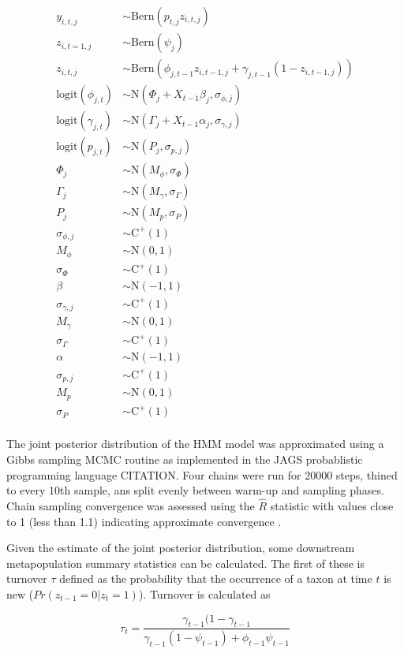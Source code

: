 \documentclass[12pt,letterpaper]{article}
\begin{document}
\begin{equation}
  \begin{aligned}
    y_{i, t, j} &\sim \mathrm{Bern}(p_{t, j} z_{i, t, j}) \\
    z_{i, t = 1, j} &\sim \mathrm{Bern}(\psi_{j}) \\
    z_{i, t, j} &\sim \mathrm{Bern}(\phi_{j, t - 1} z_{i, t - 1, j} + \gamma_{j, t - 1} (1 - z_{i, t - 1, j})) \\
    \mathrm{logit}(\phi_{j, t}) &\sim \mathrm{N}(\Phi_{j} + X_{t - 1}\beta_{j}, \sigma_{\phi, j}) \\
    \mathrm{logit}(\gamma_{j, t}) &\sim \mathrm{N}(\Gamma_{j} + X_{t - 1}\alpha_{j}, \sigma_{\gamma, j}) \\
    \mathrm{logit}(p_{j, t}) &\sim \mathrm{N}(P_{j}, \sigma_{p, j}) \\
    \Phi_{j} &\sim \mathrm{N}(M_{\phi}, \sigma_{\Phi}) \\
    \Gamma_{j} &\sim \mathrm{N}(M_{\gamma}, \sigma_{\Gamma}) \\
    P_{j} &\sim \mathrm{N}(M_{p}, \sigma_{P}) \\
    \sigma_{\phi, j} &\sim \mathrm{C}^{+}(1) \\
    M_{\phi} &\sim \mathrm{N}(0, 1) \\
    \sigma_{\Phi} &\sim \mathrm{C}^{+}(1) \\
    \beta &\sim \mathrm{N}(-1, 1) \\
    \sigma_{\gamma, j} &\sim \mathrm{C}^{+}(1) \\
    M_{\gamma} &\sim \mathrm{N}(0, 1) \\
    \sigma_{\Gamma} &\sim \mathrm{C}^{+}(1) \\
    \alpha &\sim \mathrm{N}(-1, 1) \\
    \sigma_{p, j} &\sim \mathrm{C}^{+}(1) \\
    M_{p} &\sim \mathrm{N}(0, 1) \\
    \sigma_{P} &\sim \mathrm{C}^{+}(1) \\
  \end{aligned}
\end{equation}


The joint posterior distribution of the HMM model was approximated using a Gibbs sampling MCMC routine as implemented in the JAGS probablistic programming language CITATION. Four chains were run for 20000 steps, thined to every 10th sample, ans split evenly between warm-up and sampling phases. Chain sampling convergence was assessed using the \(\hat{R}\) statistic with values close to 1 (less than 1.1) indicating approximate convergence \citep{Gelman2013d}.


Given the estimate of the joint posterior distribution, some downstream metapopulation summary statistics can be calculated. The first of these is turnover \(\tau\) defined as the probability that the occurrence of a taxon at time \(t\) is new (\(Pr(z_{t - 1} = 0 | z_{t} = 1)\))\citep{Royle2008}. Turnover is calculated as

\begin{equation}
  \tau_{t} = \frac{\gamma_{t - 1} (1 - \gamma_{t - 1}}{\gamma_{t - 1} (1 - \psi_{t - 1}) + \phi_{t - 1} \psi_{t - 1}}
\end{equation}
\end{document}
